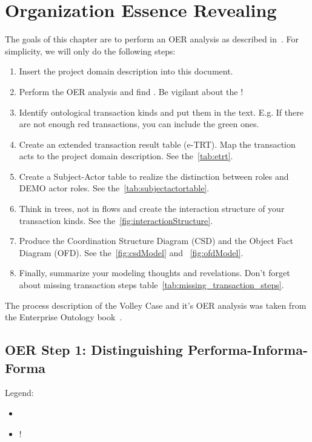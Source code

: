 \chapter{Organization Essence Revealing}

The goals of this chapter are to perform an OER analysis as described in~\cite{dietz2015teoo,dietz2020enterprise}. For simplicity, we will only do the following steps: 

\begin{enumerate}
    \item Insert the project domain description into this document. 
    \item Perform the OER analysis and find . Be vigilant about the !
    \item Identify ontological transaction kinds and put them in the text. E.g. \oact{[TK1/rq]} If there are not enough red transactions, you can include the green ones. 
    \item Create an extended transaction result table (e-TRT). Map the transaction acts to the project domain description. See the~\cref{tab:etrt}. 
    \item Create a Subject-Actor table to realize the distinction between roles and DEMO actor roles. See the~\cref{tab:subjectactortable}. 
    \item Think in trees, not in flows and create the interaction structure of your transaction kinds. See the~\cref{fig:interactionStructure}.  
    \item Produce the Coordination Structure Diagram (CSD) and the Object Fact Diagram (OFD). See the~\cref{fig:csdModel} and ~\cref{fig:ofdModel}.  
    \item Finally, summarize your modeling thoughts and revelations. Don't forget about missing transaction steps table~\cref{tab:missing_transaction_steps}. 
\end{enumerate}

The process description of the Volley Case and it's OER analysis was taken from the Enterprise Ontology book~\cite{dietz2020enterprise}. 

\section{OER Step 1: Distinguishing Performa-Informa-Forma}

Legend: 
\begin{itemize}
    \item {}
    \item {}!
\end{itemize}

